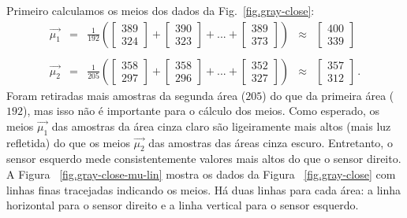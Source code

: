 Primeiro calculamos os meios dos dados da Fig.~\ref{fig.gray-close}:
\begin{displaymath}
\begin{array}{ccccc}
\vec{\mu_1} &=& {\displaystyle\frac{1}{192}} \left( \left[ \begin{array}{c} 389\\324 \end{array}\right] + \left[ \begin{array}{c} 390\\323 \end{array}\right] + ... + \left[ \begin{array}{c} 389\\373 \end{array}\right] \right)&\approx&\left[ \begin{array}{c} 400\\339 \end{array}\right]\\
\\
\vec{\mu_2} &=& {\displaystyle\frac{1}{205}} \left( \left[ \begin{array}{c} 358\\297 \end{array}\right] + \left[ \begin{array}{c} 358\\296 \end{array}\right] + ... + \left[ \begin{array}{c} 352\\327 \end{array}\right] \right)&\approx&\left[ \begin{array}{c} 357\\312 \end{array}\right]\,.
\end{array}
\end{displaymath}
Foram retiradas mais amostras da segunda área ($205$) do que da primeira área ($192$), mas isso não é importante para o cálculo dos meios. Como esperado, os meios $\vec{\mu_1}$ das amostras da área cinza claro são ligeiramente mais altos (mais luz refletida) do que os meios $\vec{\mu_2}$ das amostras das áreas cinza escuro. Entretanto, o sensor esquerdo mede consistentemente valores mais altos do que o sensor direito. A Figura ~\ref{fig.gray-close-mu-lin} mostra os dados da Figura ~\ref{fig.gray-close} com linhas finas tracejadas indicando os meios. Há duas linhas para cada área: a linha horizontal para o sensor direito e a linha vertical para o sensor esquerdo.

